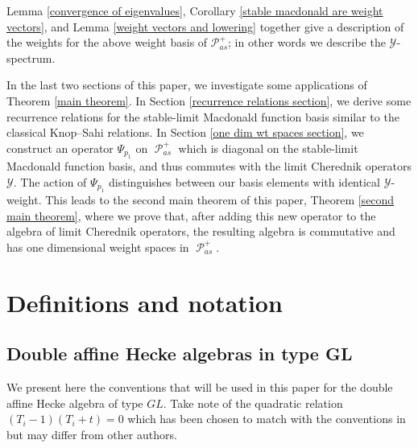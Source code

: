 \documentclass[11pt]{article}
\theoremstyle{definition}
\numberwithin{equation}{section}
\newcommand{\y}{{ \mathscr{Y} }}
\DeclareMathOperator{\sP}{\mathscr{P} }
\begin{document}
Lemma \ref{convergence of eigenvalues}, Corollary \ref{stable macdonald are weight vectors}, and Lemma \ref{weight vectors and lowering} together give a description of the weights for the above weight basis of  $\mathscr{P}_{as}^{+}$; in other words we describe the $\y$-spectrum. 

In the last two sections of this paper, we investigate some applications of Theorem \ref{main theorem}. In 
Section \ref{recurrence relations section}, we derive some recurrence relations for the stable-limit Macdonald function basis similar to the classical Knop--Sahi relations. In Section \ref{one dim wt spaces section}, we construct an operator $\Psi_{p_1}$ on $\sP_{as}^{+}$ which is diagonal on the stable-limit Macdonald function basis, and thus commutes with the limit Cherednik operators $\y$. The action of $\Psi_{p_1}$  distinguishes between our basis elements with identical $\y$-weight. This leads to the second main theorem of this paper, Theorem \ref{second main theorem}, where we prove that, after adding this new operator to the algebra of limit Cherednik operators, the resulting algebra is commutative and has one dimensional weight spaces in $\sP_{as}^{+}.$

\section{Definitions and notation}\label{defn and notations}

\subsection{Double affine Hecke algebras in type GL}

We present here the conventions that will be used in this paper for the double affine Hecke algebra of type $GL$. Take note of the quadratic relation $(T_{i}-1)(T_{i}+t) = 0$ which has been chosen to match with the conventions in \cite{Ion_2022} but may differ from other authors.
\end{document}

